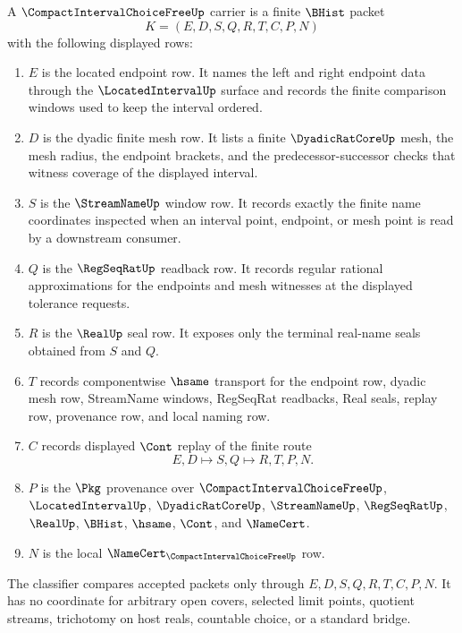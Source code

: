 \begin{definition}\label{def:compact-interval-choice-free-carrier}
A $\CompactIntervalChoiceFreeUp$ carrier is a finite $\BHist$ packet
$$
K=(E,D,S,Q,R,T,C,P,N)
$$
with the following displayed rows:
\begin{enumerate}
\item $E$ is the located endpoint row. It names the left and right endpoint data through the $\LocatedIntervalUp$ surface and records the finite comparison windows used to keep the interval ordered.
\item $D$ is the dyadic finite mesh row. It lists a finite $\DyadicRatCoreUp$ mesh, the mesh radius, the endpoint brackets, and the predecessor-successor checks that witness coverage of the displayed interval.
\item $S$ is the $\StreamNameUp$ window row. It records exactly the finite name coordinates inspected when an interval point, endpoint, or mesh point is read by a downstream consumer.
\item $Q$ is the $\RegSeqRatUp$ readback row. It records regular rational approximations for the endpoints and mesh witnesses at the displayed tolerance requests.
\item $R$ is the $\RealUp$ seal row. It exposes only the terminal real-name seals obtained from $S$ and $Q$.
\item $T$ records componentwise $\hsame$ transport for the endpoint row, dyadic mesh row, StreamName windows, RegSeqRat readbacks, Real seals, replay row, provenance row, and local naming row.
\item $C$ records displayed $\Cont$ replay of the finite route
$$
E,D \longmapsto S,Q \longmapsto R,T,P,N .
$$
\item $P$ is the $\Pkg$ provenance over $\CompactIntervalChoiceFreeUp$, $\LocatedIntervalUp$, $\DyadicRatCoreUp$, $\StreamNameUp$, $\RegSeqRatUp$, $\RealUp$, $\BHist$, $\hsame$, $\Cont$, and $\NameCert$.
\item $N$ is the local $\NameCert_{\CompactIntervalChoiceFreeUp}$ row.
\end{enumerate}
The classifier compares accepted packets only through $E,D,S,Q,R,T,C,P,N$. It has no coordinate for arbitrary open covers, selected limit points, quotient streams, trichotomy on host reals, countable choice, or a standard bridge.
\end{definition}

